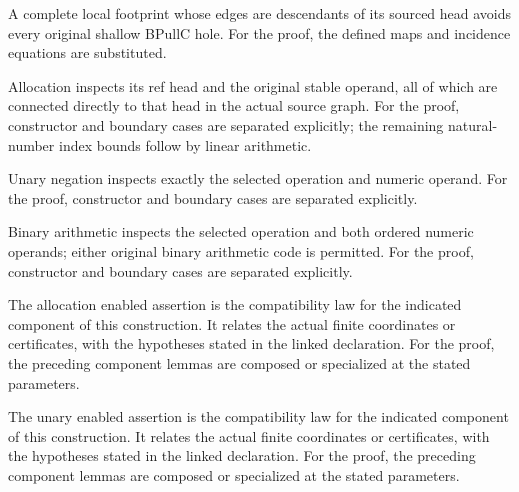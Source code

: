 A complete local footprint whose edges are descendants of its sourced head avoids every original shallow BPullC hole.
For the proof, the defined maps and incidence equations are substituted.
\par{}

Allocation inspects its ref head and the original stable operand, all of which are connected directly to that head in the actual source graph.
For the proof, constructor and boundary cases are separated explicitly; the remaining natural-number index bounds follow by linear arithmetic.
\par{}

Unary negation inspects exactly the selected operation and numeric operand.
For the proof, constructor and boundary cases are separated explicitly.
\par{}

Binary arithmetic inspects the selected operation and both ordered numeric operands; either original binary arithmetic code is permitted.
For the proof, constructor and boundary cases are separated explicitly.
\par{}

The allocation enabled assertion is the compatibility law for the indicated component of this construction. It relates the actual finite coordinates or certificates, with the hypotheses stated in the linked declaration.
For the proof, the preceding component lemmas are composed or specialized at the stated parameters.
\par{}

The unary enabled assertion is the compatibility law for the indicated component of this construction. It relates the actual finite coordinates or certificates, with the hypotheses stated in the linked declaration.
For the proof, the preceding component lemmas are composed or specialized at the stated parameters.
\par{}

